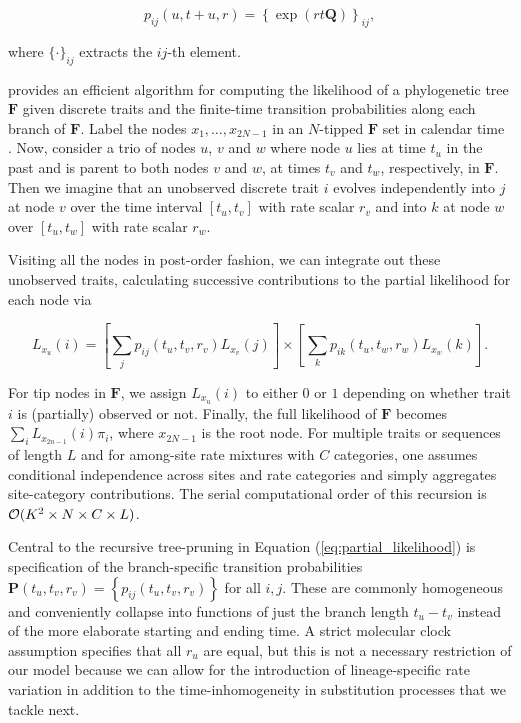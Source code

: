 \begin{equation}
p_{ij}(u,t+u,r) 
=
\left\{
\exp(
r  t  \mathbf{Q})
\right\}_{ij}
,
\label{eq:makeprobs}
\end{equation}

where $\{ \cdot \}_{ij}$ extracts the $ij$-th element.

\newcommand{\tmax}{t_{\mbox{\tiny max}}}

\citet{Felsenstein1981} provides an efficient algorithm for computing the likelihood of a phylogenetic tree $\mathbf{F}$ given discrete traits and the finite-time transition probabilities along each branch of $\mathbf{F}$.
Label the nodes $x_{1},\ldots,x_{2N-1}$ in an $N$-tipped $\mathbf{F}$ set in calendar time%
.
Now, consider a trio of nodes $u$, $v$ and $w$ where node $u$ lies at time $t_{u}$ in the past and is parent to both nodes $v$ and $w$, at times $t_v$ and $t_w$, respectively, in $\mathbf{F}$.
Then we imagine that an unobserved discrete trait $i$ evolves independently into $j$ at node $v$ over the time interval $\left[t_{u},t_{v}\right]$ with rate scalar $r_{v}$ and into $k$ at node $w$ over $\left[t_{u}, t_{w}\right]$ with rate scalar $r_{w}$.

Visiting all the nodes in post-order fashion, we can integrate out these unobserved traits, calculating successive contributions to the partial likelihood for each node via

\begin{equation}
L_{x_{u}}(i)=
\left[\underset{j}{\sum}p_{ij}(t_{u},t_{v},r_{v})L_{x_{v}}(j)\right]
\times
\left[\underset{k}{\sum}p_{ik}(t_{u},t_{w},r_{w})L_{x_{w}}(k)\right].
\label{eq:partial_likelihood}
\end{equation}

For tip nodes in $\mathbf{F}$, we assign $L_{x_{u}}(i)$ to either $0$ or $1$ depending on whether trait $i$ is (partially) observed or not.  Finally, the full likelihood of $\mathbf{F}$ becomes $\sum_{i} L_{x_{2n-1}}(i) \pi_{i}$, where $x_{2N-1}$ is the root node.  For multiple traits or sequences of length $L$ and for among-site rate mixtures with $C$ categories, one assumes conditional independence across sites and rate categories and simply aggregates site-category contributions.  The serial computational order of this recursion is ${\cal O}( K^2 \times N \times C \times L)$.  

Central to the recursive tree-pruning in Equation (\ref{eq:partial_likelihood}) is specification of the branch-specific transition probabilities
$\mathbf{P}(t_u, t_v, r_v) = \left\{
p_{ij}(t_u,t_v,r_v)
\right\}$ for all $i,j$.  These are commonly homogeneous and conveniently collapse into
functions of just the branch length $t_u - t_v$ instead of the more elaborate starting and ending time.
A strict molecular clock assumption specifies that all $r_u$ are equal, but this is not a necessary restriction of our model because we can allow for the introduction of lineage-specific rate variation in addition to the time-inhomogeneity in substitution processes that we tackle next. 

